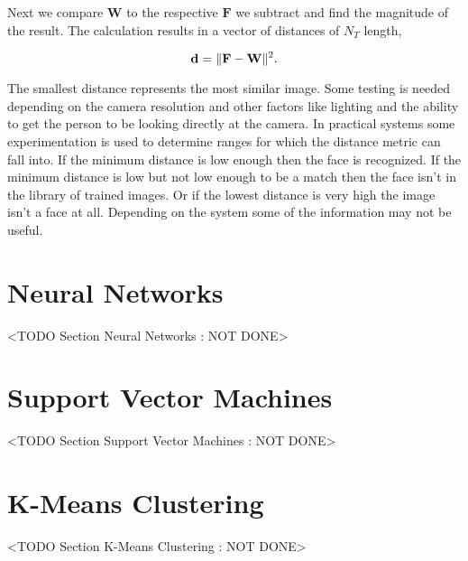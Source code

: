 Next we compare $\mathbf{W}$ to the respective $\mathbf{F}$ we subtract and find the magnitude of the result. The calculation results in a vector of distances of $N_T$ length,

\begin{equation}
\mathbf{d} = \| \mathbf{F}-\mathbf{W} \|^2.
\end{equation}	

The smallest distance represents the most similar image. Some testing is needed depending on the camera resolution and other factors like lighting and the ability to get the person to be looking directly at the camera. In practical systems some experimentation is used to determine ranges for which the distance metric can fall into. If the minimum distance is low enough then the face is recognized. If the minimum distance is low but not low enough to be a match then the face isn't in the library of trained images. Or if the lowest distance is very high the image isn't a face at all. Depending on the system some of the information may not be useful. 
	
\section{Neural Networks}
	<TODO Section Neural Networks : NOT DONE>

\section{Support Vector Machines}
	<TODO Section Support Vector Machines : NOT DONE>

\section{K-Means Clustering}
	<TODO Section K-Means Clustering : NOT DONE>


